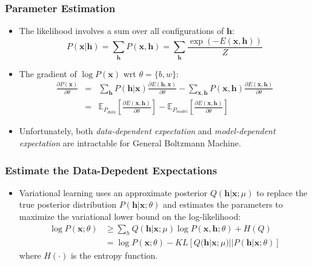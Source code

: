 \documentclass{beamer}
\newcommand{\beal}[1]{\vspace{-0.03in}\begin{align}#1\end{align}\vspace{-0.03in}}
\begin{document}
\begin{frame}
\frametitle{Parameter Estimation}
\begin{itemize}
\item The likelihood involves a sum over all configurations of $\mathbf{h}$:
\begin{equation}
P(\mathbf{x}|\mathbf{h}) = \sum_{\mathbf{h}}P(\mathbf{x, h})=\sum_{\mathbf{h}}\frac{\exp(-E(\mathbf{x, h}))}{Z}
\end{equation}
\item The gradient of $\log P(\mathbf{x})$ wrt $\theta=\{b, w\}$:
\begin{eqnarray}
\frac{\partial P(\mathbf{x})}{\partial \theta}&=&\sum_{\mathbf{h}}P(\mathbf{h}|\mathbf{x}) \frac{\partial E(\mathbf{h,x})}{\partial \theta}-\sum_{\mathbf{x, h}}P(\mathbf{x, h})\frac{\partial E(\mathbf{x, h})}{\partial \theta}\\
&=&\mathbb{E}_{P_{data}}[\frac{\partial E(\mathbf{x,h})}{\partial \theta}]-\mathbb{E}_{P_{model}}[\frac{\partial E(\mathbf{x, h})}{\partial \theta}]
\end{eqnarray}
\item Unfortunately, both \textit{data-dependent expectation} and \textit{model-dependent expectation} are intractable for General Boltzmann Machine.
\end{itemize}
\end{frame}


\begin{frame}
\frametitle{Estimate the Data-Depedent Expectations}
\begin{itemize}
\item Variational learning uses an approximate posterior $Q(\mathbf{h}|\mathbf{x};\mu)$ to replace the true posterior distribution $P(\mathbf{h}|\mathbf{x};\theta)$ and estimates the parameters to maximize the variational lower bound on the log-likelihood:
\beal{
\log P(\mathbf{x};\theta) &\geq \sum_h Q(\mathbf{h}|\mathbf{x};\mu) \log P(\mathbf{x}, \mathbf{h}; \theta) + H(Q)\\
&= \log P(\mathbf{x}; \theta) - KL[Q(\mathbf{h}|\mathbf{x};\mu) || P(\mathbf{h}|\mathbf{x};\theta)]
}
where $H(\cdot)$ is the entropy function. 

\end{itemize}
\end{frame}

\end{document}

